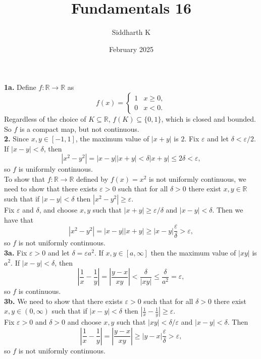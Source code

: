 \documentclass{article}
\title{Fundamentals 16}
\author{Siddharth K}
\date{February 2025}
\newcommand{\R}{\mathbb{R}}
\newcommand{\eps}{\varepsilon}
\begin{document}
\maketitle

\textbf{1a.} Define $f: \R \to \R$ as
$$f(x) = \begin{cases}
    1 & x \ge 0, \\
    0 & x < 0.
\end{cases}$$
Regardless of the choice of $K \subseteq \R$, $f(K) \subseteq \{0, 1\}$, which is closed and bounded. So $f$ is a compact map, but not continuous. \\

\textbf{2.} Since $x, y \in [-1, 1]$, the maximum value of $|x + y|$ is $2$. Fix $\eps$ and let $\delta < \eps/2$. If $|x - y| < \delta$, then
$$|x^2 - y^2| = |x - y||x + y| < \delta |x + y| \le 2\delta < \eps,$$
so $f$ is uniformly continuous. \\

To show that $f: \R \to \R$ defined by $f(x) = x^2$ is not uniformly continuous, we need to show that there exists $\eps > 0$ such that for all $\delta > 0$ there exist $x, y \in \R$ such that if $|x - y| < \delta$ then $|x^2 - y^2| \ge \eps$. \\

Fix $\eps$ and $\delta$, and choose $x, y$ such that $|x + y| \ge \eps/\delta$ and $|x - y| < \delta$. Then we have that
$$|x^2 - y^2| = |x - y||x + y| \ge |x - y|\frac{\eps}{\delta} > \eps,$$
so $f$ is not uniformly continuous. \\

\textbf{3a.} Fix $\eps > 0$ and let $\delta = \eps a^2$. If $x, y \in [a, \infty]$ then the maximum value of $|xy|$ is $a^2$. If $|x - y| < \delta$, then
$$\left|\frac{1}{x} - \frac{1}{y}\right| = \left|\frac{y - x}{xy}\right| < \frac{\delta}{|xy|} \le \frac{\delta}{a^2} = \eps,$$
so $f$ is continuous. \\

\textbf{3b.} We need to show that there exists $\eps > 0$ such that for all $\delta > 0$ there exist $x, y \in (0, \infty)$ such that if $|x - y| < \delta$ then $\left|\frac{1}{x} - \frac{1}{y}\right| \ge \eps$. \\

Fix $\eps > 0$ and $\delta > 0$ and choose $x, y$ such that $|xy| < \delta/\eps$ and $|x - y| < \delta$. Then
$$\left|\frac{1}{x} - \frac{1}{y}\right| = \left|\frac{y - x}{xy}\right| \ge |y - x|\frac{\eps}{\delta} > \eps,$$
so $f$ is not uniformly continuous. \\
\end{document}
